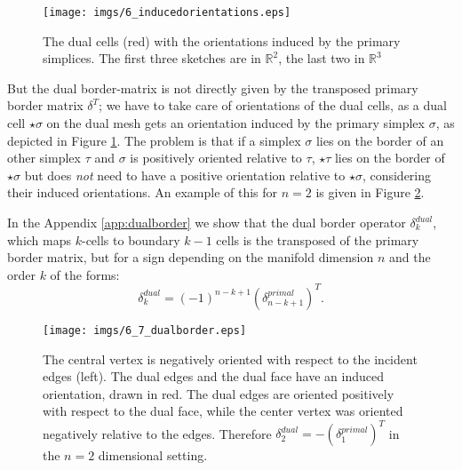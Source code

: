 \begin{figure}%
\texttt{[image: imgs/6\_inducedorientations.eps]}
\caption{The dual cells (red) with the orientations induced by the primary simplices. The first three sketches are in $\mathbb R^2$, the last two in $\mathbb R^3$}%
\label{fig:6_inducedorientations}%
\end{figure}

But the dual border-matrix is not directly given by the transposed primary border matrix $\delta^T$; we have to take care of orientations of the dual cells, as a dual cell $\star \sigma$ on the dual mesh gets an orientation induced by the primary simplex $\sigma$, as depicted in Figure \ref{fig:6_inducedorientations}. The problem is that if a simplex $\sigma$ lies on the border of an other simplex $\tau$ and $\sigma$ is positively oriented relative to $\tau$, $\star \tau$ lies on the border of $\star \sigma$ but does \emph{not} need to have a positive orientation relative to $\star \sigma$, considering their induced orientations. An example of this for $n=2$ is given in Figure \ref{fig:6_dualborder}.

In the Appendix \ref{app:dualborder} we show that the dual border operator $\delta_{k}^{dual}$, which maps $k$-cells to boundary $k-1$ cells is  the transposed of the primary border matrix, but for a sign depending on the manifold dimension $n$ and the order $k$ of the forms:
\begin{equation}\delta_{k}^{dual} = (-1)^{n-k+1} (\delta_{n-k+1}^{primal})^T\label{eq:dualBorderOp}.\end{equation}



\begin{figure}%
\begin{center}
\texttt{[image: imgs/6\_7\_dualborder.eps]}%
\end{center}
\caption{The central vertex is negatively oriented with respect to the incident edges (left). The dual edges and the dual face have an induced orientation, drawn in red. The dual edges are oriented positively with respect to the dual face, while the center vertex was oriented negatively relative to the edges. Therefore $\delta_{2}^{dual} = - (\delta_1^{primal})^T$ in the $n=2$ dimensional setting.}%
\label{fig:6_dualborder}%
\end{figure}

